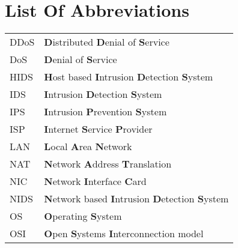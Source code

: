 \chapter*{List Of Abbreviations}
\begin{flushleft}
\renewcommand{\baselinestretch}{1.5}
\small\normalsize
\begin{longtable}{ll}
DDoS & \textbf{D}istributed \textbf{D}enial of \textbf{S}ervice\\
DoS & \textbf{D}enial of \textbf{S}ervice\\
HIDS & \textbf{H}ost based \textbf{I}ntrusion \textbf{D}etection \textbf{S}ystem\\
IDS & \textbf{I}ntrusion \textbf{D}etection \textbf{S}ystem\\
IPS & \textbf{I}ntrusion \textbf{P}revention \textbf{S}ystem\\
ISP & \textbf{I}nternet \textbf{S}ervice \textbf{P}rovider\\
LAN & \textbf{L}ocal \textbf{A}rea \textbf{N}etwork\\
NAT & \textbf{N}etwork \textbf{A}ddress \textbf{T}ranslation\\
NIC & \textbf{N}etwork \textbf{I}nterface \textbf{C}ard\\
NIDS & \textbf{N}etwork based \textbf{I}ntrusion \textbf{D}etection \textbf{S}ystem\\
OS & \textbf{O}perating \textbf{S}ystem\\
OSI & \textbf{O}pen \textbf{S}ystems \textbf{I}nterconnection model\\
\end{longtable}
\end{flushleft}
